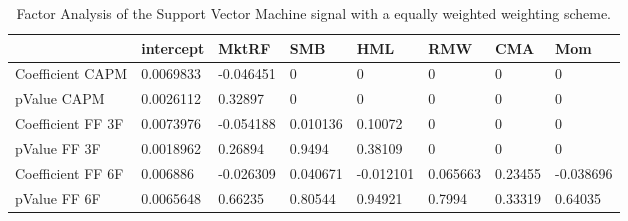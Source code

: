\begin{table}[H]
\centering
\begin{tabular}{llllllll}
\hline& intercept & MktRF & SMB & HML & RMW & CMA & Mom \\ 
\hline 
Coefficient CAPM & 0.0069833 & -0.046451 & 0 & 0 & 0 & 0 & 0 \\ 
pValue CAPM & 0.0026112 & 0.32897 & 0 & 0 & 0 & 0 & 0 \\ 
Coefficient FF 3F & 0.0073976 & -0.054188 & 0.010136 & 0.10072 & 0 & 0 & 0 \\ 
pValue FF 3F & 0.0018962 & 0.26894 & 0.9494 & 0.38109 & 0 & 0 & 0 \\ 
Coefficient FF 6F & 0.006886 & -0.026309 & 0.040671 & -0.012101 & 0.065663 & 0.23455 & -0.038696 \\ 
pValue FF 6F & 0.0065648 & 0.66235 & 0.80544 & 0.94921 & 0.7994 & 0.33319 & 0.64035 \\ 
\hline
\end{tabular}
\caption{Factor Analysis of the Support Vector Machine signal with a equally weighted weighting scheme.}
\label{SVM_MODEL_EW_FACTOR}
\end{table}
